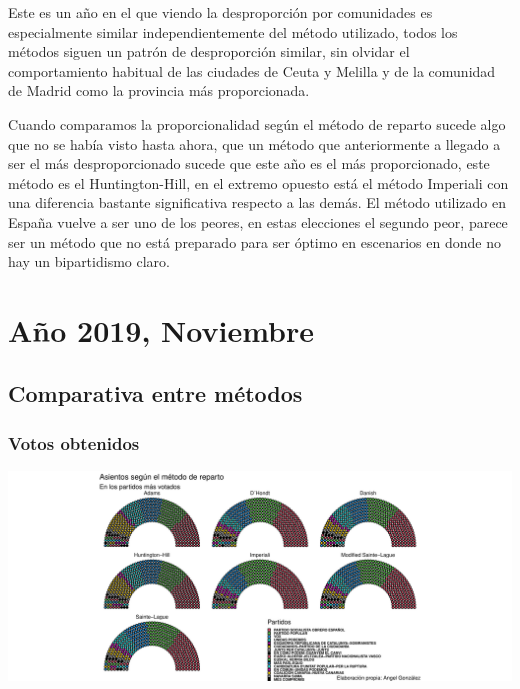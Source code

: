 \documentclass[12pt,a4paper,]{book}
\numberwithin{dummy}{section}
\theoremstyle{ocrenumbox}
\theoremstyle{blacknumex}
\theoremstyle{blacknumbox}
\theoremstyle{ocrenum}
\theoremstyle{ocrenum}
\begin{document}
Este es un año en el que viendo la desproporción por comunidades es
especialmente similar independientemente del método utilizado, todos los
métodos siguen un patrón de desproporción similar, sin olvidar el
comportamiento habitual de las ciudades de Ceuta y Melilla y de la
comunidad de Madrid como la provincia más proporcionada.

Cuando comparamos la proporcionalidad según el método de reparto sucede
algo que no se había visto hasta ahora, que un método que anteriormente
a llegado a ser el más desproporcionado sucede que este año es el más
proporcionado, este método es el Huntington-Hill, en el extremo opuesto
está el método Imperiali con una diferencia bastante significativa
respecto a las demás. El método utilizado en España vuelve a ser uno de
los peores, en estas elecciones el segundo peor, parece ser un método
que no está preparado para ser óptimo en escenarios en donde no hay un
bipartidismo claro.

\hypertarget{auxf1o-2019-noviembre}{%
\section{Año 2019, Noviembre}\label{auxf1o-2019-noviembre}}

\hypertarget{comparativa-entre-muxe9todos-14}{%
\subsection{Comparativa entre
métodos}\label{comparativa-entre-muxe9todos-14}}

\hypertarget{votos-obtenidos-14}{%
\subsubsection{Votos obtenidos}\label{votos-obtenidos-14}}

\begin{center}\includegraphics[width=0.95\linewidth]{figurasR/unnamed-chunk-188-1} \end{center}
\end{document}
